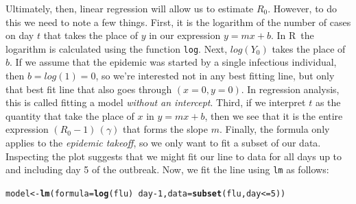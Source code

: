 \documentclass{article}\usepackage[]{graphicx}\usepackage[]{color}
\makeatletter
\newcommand{\hlnum}[1]{\textcolor[rgb]{0.686,0.059,0.569}{#1}}%
\newcommand{\hlopt}[1]{\textcolor[rgb]{0,0,0}{#1}}%
\newcommand{\hlstd}[1]{\textcolor[rgb]{0.345,0.345,0.345}{#1}}%
\newcommand{\hlkwb}[1]{\textcolor[rgb]{0.69,0.353,0.396}{#1}}%
\newcommand{\hlkwc}[1]{\textcolor[rgb]{0.333,0.667,0.333}{#1}}%
\newcommand{\hlkwd}[1]{\textcolor[rgb]{0.737,0.353,0.396}{\textbf{#1}}}%
\newenvironment{kframe}{%
 \def\at@end@of@kframe{}%
 \ifinner\ifhmode%
  \def\at@end@of@kframe{\end{minipage}}%
  \begin{minipage}{\columnwidth}%
 \fi\fi%
 \def\FrameCommand##1{\hskip\@totalleftmargin \hskip-\fboxsep
 \colorbox{shadecolor}{##1}\hskip-\fboxsep
     \hskip-\linewidth \hskip-\@totalleftmargin \hskip\columnwidth}%
 \MakeFramed {\advance\hsize-\width
   \@totalleftmargin\z@ \linewidth\hsize
   \@setminipage}}%
 {\par\unskip\endMakeFramed%
 \at@end@of@kframe}
\newenvironment{knitrout}{}{} %
\newcommand{\R}{\textsf{R}}
\newcommand{\code}[1]{\texttt{#1}}
\theoremstyle{exercise}
\makeatother
\begin{document}
Ultimately, then, linear regression will allow us to estimate $R_0$. However, to do this we need to note a few things. First, it is the logarithm of the number of cases on day $t$ that takes the place of $y$ in our expression $y=mx+b$. In \R\ the logarithm is calculated using the function \code{log}. Next, $log(Y_0)$ takes the place of $b$. If we assume that the epidemic was started by a single infectious individual, then $b=log(1)=0$, so we're interested not in any best fitting line, but only that best fit line that also goes through $(x=0, y=0)$. In regression analysis, this is called fitting a model \textit{without an intercept}. Third, if we interpret $t$ as the quantity that take the place of $x$ in $y=mx+b$, then we see that it is the entire expression $(R_0-1)\,(\gamma)$ that forms the slope $m$. Finally, the formula only applies to the \textit{epidemic takeoff}, so we only want to fit a subset of our data. Inspecting the plot suggests that we might fit our line to data for all days up to and including day 5 of the outbreak. Now, we fit the line using \code{lm} as follows:

\begin{knitrout}
\color{fgcolor}\begin{kframe}
\begin{alltt}
\hlstd{model} \hlkwb{<-} \hlkwd{lm}\hlstd{(}\hlkwc{formula}\hlstd{=}\hlkwd{log}\hlstd{(flu)}\hlopt{~}\hlstd{day}\hlopt{-}\hlnum{1}\hlstd{,}\hlkwc{data}\hlstd{=}\hlkwd{subset}\hlstd{(flu,day}\hlopt{<=}\hlnum{5}\hlstd{))}
\end{alltt}
\end{kframe}
\end{knitrout}
\end{document}
